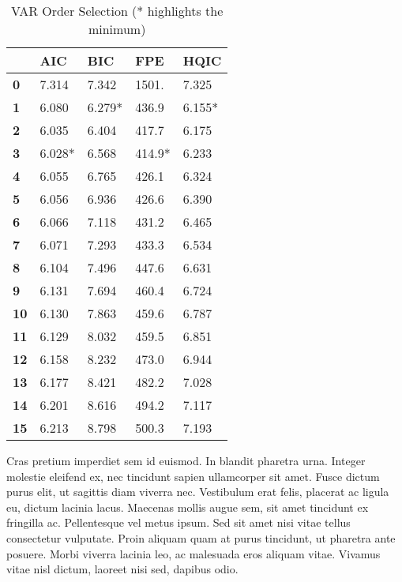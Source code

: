 \documentclass{article}
\begin{document}
\begin{table}[!ht]
    \centering
    \begin{tabular}{lllll}
      \toprule
        ~ & \textbf{AIC} & \textbf{BIC} & \textbf{FPE} & \textbf{HQIC} \\ \midrule
        \textbf{0} & 7.314 & 7.342 & 1501. & 7.325 \\ 
        \textbf{1} & 6.080 & 6.279* & 436.9 & 6.155* \\ 
        \textbf{2} & 6.035 & 6.404 & 417.7 & 6.175 \\ 
        \textbf{3} & 6.028* & 6.568 & 414.9* & 6.233 \\ 
        \textbf{4} & 6.055 & 6.765 & 426.1 & 6.324 \\ 
        \textbf{5} & 6.056 & 6.936 & 426.6 & 6.390 \\ 
        \textbf{6} & 6.066 & 7.118 & 431.2 & 6.465 \\ 
        \textbf{7} & 6.071 & 7.293 & 433.3 & 6.534 \\ 
        \textbf{8} & 6.104 & 7.496 & 447.6 & 6.631 \\ 
        \textbf{9} & 6.131 & 7.694 & 460.4 & 6.724 \\ 
        \textbf{10} & 6.130 & 7.863 & 459.6 & 6.787 \\ 
        \textbf{11} & 6.129 & 8.032 & 459.5 & 6.851 \\ 
        \textbf{12} & 6.158 & 8.232 & 473.0 & 6.944 \\ 
        \textbf{13} & 6.177 & 8.421 & 482.2 & 7.028 \\ 
        \textbf{14} & 6.201 & 8.616 & 494.2 & 7.117 \\ 
        \textbf{15} & 6.213 & 8.798 & 500.3 & 7.193 \\ \bottomrule
    \end{tabular}
    \caption{VAR Order Selection (* highlights the minimum)}
    \label{VAROrderSelection}
\end{table}

Cras pretium imperdiet sem id euismod. In blandit pharetra urna. Integer
molestie eleifend ex, nec tincidunt sapien ullamcorper sit amet. Fusce
dictum purus elit, ut sagittis diam viverra nec. Vestibulum erat felis,
placerat ac ligula eu, dictum lacinia lacus. Maecenas mollis augue sem,
sit amet tincidunt ex fringilla ac. Pellentesque vel metus ipsum. Sed
sit amet nisi vitae tellus consectetur vulputate. Proin aliquam quam at
purus tincidunt, ut pharetra ante posuere. Morbi viverra lacinia leo, ac
malesuada eros aliquam vitae. Vivamus vitae nisl dictum, laoreet nisi
sed, dapibus odio.
\end{document}
